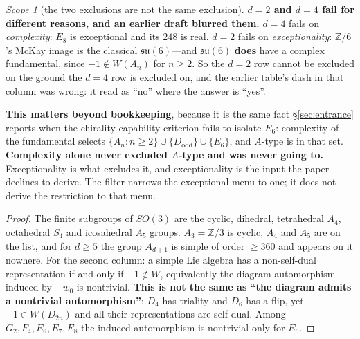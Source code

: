\documentclass[11pt,reqno]{amsart}
\theoremstyle{plain}
\theoremstyle{definition}
\theoremstyle{remark}
\newtheorem{scope}[theorem]{Scope}
\newcommand{\Z}{\mathbb{Z}}
\newcommand{\su}{\mathfrak{su}}
\begin{document}
\begin{scope}[the two exclusions are not the same exclusion]\label{sc:twogrounds}
\textbf{$d=2$ and $d=4$ fail for different reasons, and an earlier draft blurred them.}
$d=4$ fails on \emph{complexity}: $E_8$ is exceptional and its $248$ is real. $d=2$ fails
on \emph{exceptionality}: $\Z/6$'s McKay image is the classical $\su(6)$---and
$\su(6)$ \textbf{does} have a complex fundamental, since $-1\notin W(A_n)$ for $n\ge2$.
So the $d=2$ row cannot be excluded on the ground the $d=4$ row is excluded on, and the
earlier table's dash in that column was wrong: it read as ``no'' where the answer is
``yes''.

\textbf{This matters beyond bookkeeping}, because it is the same fact §\ref{sec:entrance}
reports when the chirality-capability criterion fails to isolate $E_6$: complexity of the
fundamental selects $\{A_n:n\ge2\}\cup\{D_{\text{odd}}\}\cup\{E_6\}$, and $A$-type is in
that set. \textbf{Complexity alone never excluded $A$-type and was never going to.}
Exceptionality is what excludes it, and exceptionality is the input the paper declines to
derive. The filter narrows the exceptional menu to one; it does not derive the
restriction to that menu.
\end{scope}

\begin{proof}
The finite subgroups of $SO(3)$ are the cyclic, dihedral, tetrahedral $A_4$, octahedral
$S_4$ and icosahedral $A_5$ groups. $A_3=\Z/3$ is cyclic, $A_4$ and $A_5$ are on the
list, and for $d\ge5$ the group $A_{d+1}$ is simple of order $\ge360$ and appears on it
nowhere. For the second column: a simple Lie algebra has a non-self-dual representation
if and only if $-1\notin W$, equivalently the diagram automorphism induced by $-w_0$ is
nontrivial. \textbf{This is not the same as ``the diagram admits a nontrivial
automorphism''}: $D_4$ has triality and $D_6$ has a flip, yet $-1\in W(D_{2n})$ and all
their representations are self-dual. Among $G_2,F_4,E_6,E_7,E_8$ the induced automorphism
is nontrivial only for $E_6$.
\end{proof}
\end{document}
